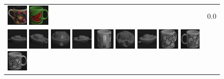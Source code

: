 \begin{figure}[tbp]
\begin{tabular}{m{11cm} | m{3cm} |}
\includegraphics[width=1cm]{coil/beeld-61.eps}
\includegraphics[width=1cm]{coil/beeld-30.eps}
& {\scriptsize 0.0}
\\
\includegraphics[width=1cm]{coil/beeld-24.eps}
\includegraphics[width=1cm]{coil/beeld-25.eps}
\includegraphics[width=1cm]{coil/beeld-28.eps}
\includegraphics[width=1cm]{coil/beeld-27.eps}
\includegraphics[width=1cm]{coil/beeld-50.eps}
\includegraphics[width=1cm]{coil/beeld-26.eps}
\includegraphics[width=1cm]{coil/beeld-29.eps}
\includegraphics[width=1cm]{coil/beeld-53.eps}
\includegraphics[width=1cm]{coil/beeld-51.eps}
\includegraphics[width=1cm]{coil/beeld-48.eps}

\end{tabular}
\end{figure}
